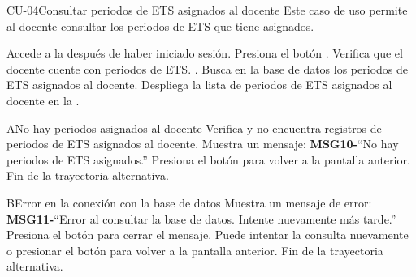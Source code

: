 

\begin{UseCase}{CU-04}{Consultar periodos de ETS asignados al docente}{
		Este caso de uso permite al docente consultar los periodos de ETS que tiene asignados. 
	}
\end{UseCase}
\begin{UCtrayectoria}
	\UCpaso[\UCactor] Accede a la  después de haber iniciado sesión.
	\UCpaso[\UCactor] Presiona el botón .
	\UCpaso Verifica que el docente cuente con periodos de ETS. .
	\UCpaso Busca en la base de datos los periodos de ETS asignados al docente.
	\UCpaso Despliega la lista de periodos de ETS asignados al docente en la .
\end{UCtrayectoria}
\begin{UCtrayectoriaA}{A}{No hay periodos asignados al docente}
	\UCpaso Verifica y no encuentra registros de periodos de ETS asignados al docente.
	\UCpaso Muestra un mensaje: {\bf MSG10-}{``No hay periodos de ETS asignados.''}
	\UCpaso[\UCactor] Presiona el botón  para volver a la pantalla anterior.
	\UCpaso Fin de la trayectoria alternativa.
\end{UCtrayectoriaA}
\begin{UCtrayectoriaA}{B}{Error en la conexión con la base de datos}
	\UCpaso Muestra un mensaje de error: {\bf MSG11-}{``Error al consultar la base de datos. Intente nuevamente más tarde.''}
	\UCpaso[\UCactor] Presiona el botón  para cerrar el mensaje.
	\UCpaso[\UCactor] Puede intentar la consulta nuevamente o presionar el botón  para volver a la pantalla anterior.
	\UCpaso Fin de la trayectoria alternativa.
\end{UCtrayectoriaA}
